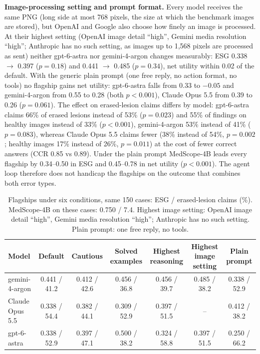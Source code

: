 \documentclass[11pt]{article}
\begin{document}
\textbf{Image-processing setting and prompt format.} Every model receives the same PNG (long side at most 768 pixels, the size at which the benchmark images are stored), but OpenAI and Google also choose how finely an image is processed. At their highest setting (OpenAI image detail ``high'', Gemini media resolution ``high''; Anthropic has no such setting, as images up to 1,568 pixels are processed as sent) neither gpt-6-astra nor gemini-4-argon changes measurably: ESG 0.338 $\to$ 0.397 ($p=0.18$) and 0.441 $\to$ 0.485 ($p=0.34$), net utility within 0.02 of the default. With the generic plain prompt (one free reply, no action format, no tools) no flagship gains net utility: gpt-6-astra falls from 0.33 to $-0.05$ and gemini-4-argon from 0.55 to 0.28 (both $p<0.001$), Claude Opus 5.5 from 0.39 to 0.26 ($p=0.061$). The effect on erased-lesion claims differs by model: gpt-6-astra claims 66\% of erased lesions instead of 53\% ($p=0.023$) and 55\% of findings on healthy images instead of 33\% ($p<0.001$), gemini-4-argon 53\% instead of 41\% ($p=0.083$), whereas Claude Opus 5.5 claims fewer (38\% instead of 54\%, $p=0.002$; healthy images 17\% instead of 26\%, $p=0.011$) at the cost of fewer correct answers (CCR 0.85 vs 0.89). Under the plain prompt MedScope-4B leads every flagship by 0.34--0.50 in ESG and 0.45--0.78 in net utility ($p<0.001$). The agent loop therefore does not handicap the flagships on the outcome that combines both error types.

\begin{table}[t]
\centering\footnotesize\setlength{\tabcolsep}{4pt}
\caption{Flagships under six conditions, same 150 cases: ESG / erased-lesion claims (\%). MedScope-4B on these cases: 0.750 / 7.4. Highest image setting: OpenAI image detail ``high'', Gemini media resolution ``high''; Anthropic has no such setting. Plain prompt: one free reply, no tools.}
\label{tab:prompt}
\begin{tabular}{lcccccc}
\toprule
Model & Default & Cautious & Solved examples & Highest reasoning & Highest image setting & Plain prompt \\
\midrule
gemini-4-argon & 0.441 / 41.2 & 0.412 / 42.6 & 0.456 / 36.8 & 0.456 / 39.7 & 0.485 / 38.2 & 0.338 / 52.9 \\
Claude Opus 5.5 & 0.338 / 54.4 & 0.382 / 44.1 & 0.309 / 52.9 & 0.397 / 51.5 & -- & 0.412 / 38.2 \\
gpt-6-astra & 0.338 / 52.9 & 0.397 / 47.1 & 0.500 / 38.2 & 0.324 / 58.8 & 0.397 / 51.5 & 0.250 / 66.2 \\
\bottomrule
\end{tabular}
\end{table}
\end{document}
